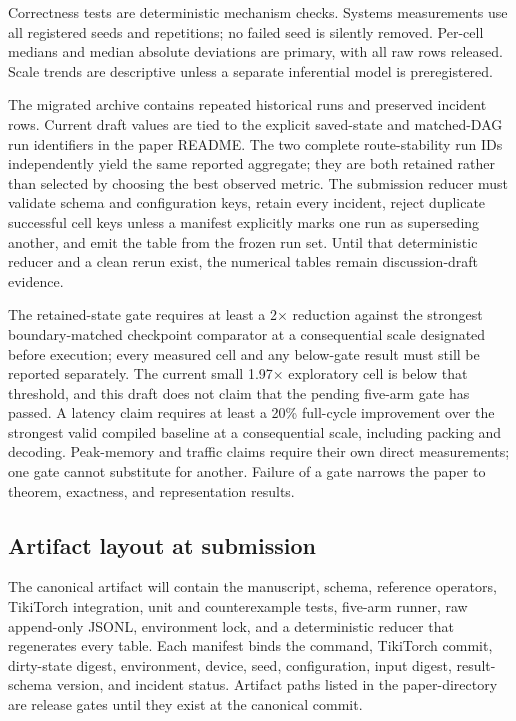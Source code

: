 Correctness tests are deterministic mechanism checks.  Systems measurements
use all registered seeds and repetitions; no failed seed is silently removed.
Per-cell medians and median absolute deviations are primary, with all raw rows
released.  Scale trends are descriptive unless a separate inferential model is
preregistered.

The migrated archive contains repeated historical runs and preserved incident
rows.  Current draft values are tied to the explicit saved-state and matched-DAG
run identifiers in the paper README.  The two complete route-stability run IDs
independently yield the same reported aggregate; they are both retained rather
than selected by choosing the best observed metric.  The
submission reducer must validate schema and configuration keys, retain every
incident, reject duplicate successful cell keys unless a manifest explicitly
marks one run as superseding another, and emit the table from the frozen run
set.  Until that deterministic reducer and a clean rerun exist, the numerical
tables remain discussion-draft evidence.

The retained-state gate requires at least a 2$\times$ reduction against the
strongest boundary-matched checkpoint comparator at a consequential scale
designated before execution; every measured cell and any below-gate result must
still be reported separately.  The current small 1.97$\times$ exploratory cell
is below that threshold, and this draft does not claim that the pending
five-arm gate has passed.  A latency claim
requires at least a 20\% full-cycle improvement over the strongest valid
compiled baseline at a consequential scale, including packing and decoding.
Peak-memory and traffic claims require their own direct measurements; one gate
cannot substitute for another.  Failure of a gate narrows the paper to theorem,
exactness, and representation results.

\subsection{Artifact layout at submission}

The canonical artifact will contain the manuscript, schema, reference
operators, TikiTorch integration, unit and counterexample tests, five-arm runner,
raw append-only JSONL, environment lock, and a deterministic reducer that
regenerates every table.  Each manifest binds the command, TikiTorch commit,
dirty-state digest, environment, device, seed, configuration, input digest,
result-schema version, and incident status.  Artifact paths listed in the
paper-directory  are release gates until they exist at the
canonical commit.
